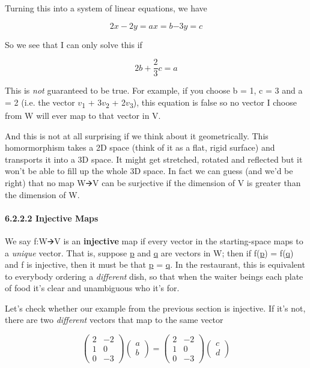 \documentclass[oneside,english]{amsbook}
\numberwithin{section}{chapter}
\theoremstyle{plain}
\theoremstyle{definition}
\begin{document}
Turning this into a system of linear equations, we have

\[{2x - 2y = a
}{x = b
}{- 3y = c}\]

So we see that I can only solve this if

\[2b + \frac{2}{3}c = a\]

This is \emph{not} guaranteed to be true. For example, if you choose b =
1, c = 3 and a = 2 (i.e. the vector $v$\textsubscript{1} +
3$v$\textsubscript{2} + 2$v$\textsubscript{3}), this equation is
false so no vector I choose from W will ever map to that vector in V.

And this is not at all surprising if we think about it geometrically.
This homormorphism takes a 2D space (think of it as a flat, rigid
surface) and transports it into a 3D space. It might get stretched,
rotated and reflected but it won't be able to fill up the whole 3D
space. In fact we can guess (and we'd be right) that no map W🡪V can be
surjective if the dimension of V is greater than the dimension of W.

\paragraph{6.2.2.2 Injective Maps}\label{injective-maps}

We say f:W🡪V is an \textbf{injective} map if every vector in the
starting-space maps to a \emph{unique} vector. That is, suppose \ul{p}
and \ul{q} are vectors in W; then if f(\ul{p}) = f(\ul{q}) and f is
injective, then it must be that \ul{p} = \ul{q}. In the restaurant, this
is equivalent to everybody ordering a \emph{different} dish, so that
when the waiter beings each plate of food it's clear and unambiguous who
it's for.

Let's check whether our example from the previous section is injective.
If it's not, there are two \emph{different} vectors that map to the same
vector

\[\begin{pmatrix}
	2 & - 2 \\
	1 & 0 \\
	0 & - 3
\end{pmatrix}\begin{pmatrix}
	a \\
	b
\end{pmatrix} = \begin{pmatrix}
	2 & - 2 \\
	1 & 0 \\
	0 & - 3
\end{pmatrix}\begin{pmatrix}
	c \\
	d
\end{pmatrix}\]
\end{document}
